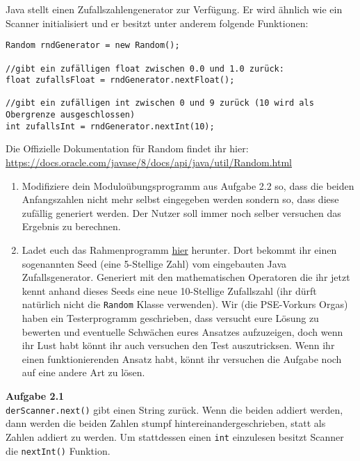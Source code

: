\documentclass{../../sheet}
\begin{document}
\newpage
{}
Java stellt einen Zufallszahlengenerator zur Verfügung. Er wird ähnlich wie ein Scanner initialisiert und er besitzt unter anderem folgende Funktionen:

\begin{verbatim}
Random rndGenerator = new Random();

//gibt ein zufälligen float zwischen 0.0 und 1.0 zurück:
float zufallsFloat = rndGenerator.nextFloat();

//gibt ein zufälligen int zwischen 0 und 9 zurück (10 wird als Obergrenze ausgeschlossen)
int zufallsInt = rndGenerator.nextInt(10);
\end{verbatim}
Die Offizielle Dokumentation für Random findet ihr hier: \url{https://docs.oracle.com/javase/8/docs/api/java/util/Random.html}

\begin{enumerate}
    \item Modifiziere dein Moduloübungsprogramm aus Aufgabe 2.2 so, dass die beiden Anfangszahlen nicht mehr selbst eingegeben werden sondern so, dass diese zufällig generiert werden. Der Nutzer soll immer noch selber versuchen das Ergebnis zu berechnen. 
    \item Ladet euch das Rahmenprogramm \href{https://fius.de/wp-content/uploads/2025/10/Day1Highperformer.zip}{hier} herunter. Dort bekommt ihr einen sogenannten Seed (eine 5-Stellige Zahl) vom eingebauten Java Zufallsgenerator. Generiert mit den mathematischen Operatoren die ihr jetzt kennt anhand dieses Seeds eine neue 10-Stellige Zufallszahl (ihr dürft natürlich nicht die \texttt{Random} Klasse verwenden). Wir (die PSE-Vorkurs Orgas) haben ein Testerprogramm geschrieben, dass versucht eure Lösung zu bewerten und eventuelle Schwächen eures Ansatzes aufzuzeigen, doch wenn ihr Lust habt könnt ihr auch versuchen den Test auszutricksen. Wenn ihr einen funktionierenden Ansatz habt, könnt ihr versuchen die Aufgabe noch auf eine andere Art zu lösen.   
\end{enumerate}

\newpage
{}
\hypertarget{Aufgabe_2.1}{}
\textbf{Aufgabe 2.1}\\
\texttt{derScanner.next()} gibt einen String zurück. Wenn die beiden addiert werden, dann werden die beiden Zahlen stumpf hintereinandergeschrieben, statt als Zahlen addiert zu werden. Um stattdessen einen \texttt{int} einzulesen besitzt Scanner die \texttt{nextInt()} Funktion.
\end{document}
